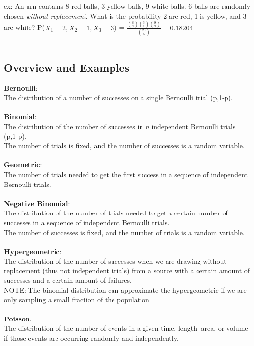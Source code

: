 \documentclass[12pt, a4paper]{article}
\begin{document}
	\noindent ex: An urn contains 8 red balls, 3 yellow balls, 9 white balls. 6 balls are randomly chosen \textit{without replacement}. What is the probability 2 are red, 1 is yellow, and 3 are white?
	P($X_1 = 2, X_2 = 1, X_3 = 3$) = $\frac{\binom{8}{2}\binom{3}{1}\binom{9}{3}}{\binom{20}{6}} = 0.18204 $ \\~\\
	
	\subsection{Overview and Examples}
	\textbf{Bernoulli}: \\
	The distribution of a number of successes on a single Bernoulli trial (p,1-p). \\~\\
	\textbf{Binomial}: \\
	The distribution of the number of successes in \textit{n} independent Bernoulli trials (p,1-p). \\
	The number of trials is fixed, and the number of successes is a random variable. \\~\\
	\textbf{Geometric}: \\
	The number of trials needed to get the first success in a sequence of independent Bernoulli trials. \\~\\
	\textbf{Negative Binomial}: \\
	The distribution of the number of trials needed to get a certain number of successes in a sequence of independent Bernoulli trials. \\
	The number of successes is fixed, and the number of trials is a random variable. \\~\\
	\textbf{Hypergeometric}: \\
	The distribution of the number of successes when we are drawing without replacement (thus not independent trials) from a source with a certain amount of successes and a certain amount of failures. \\
	NOTE: The binomial distribution can approximate the hypergeometric if we are only sampling a small fraction of the population \\~\\
	\textbf{Poisson}: \\
	The distribution of the number of events in a given time, length, area, or volume if those events are occurring randomly and independently. \\
	
\end{document}
